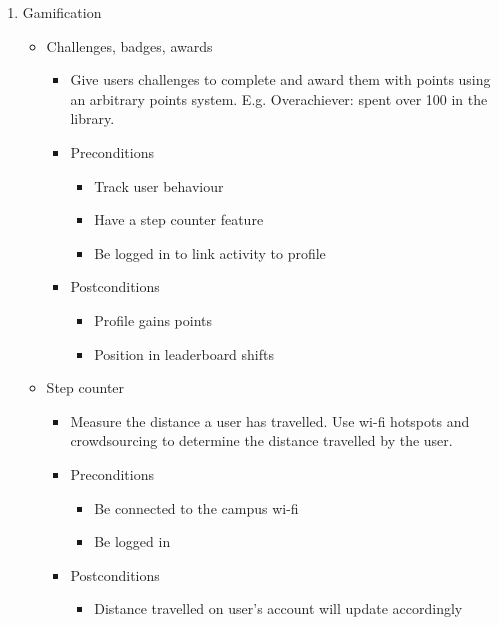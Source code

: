 \documentclass[12pt]{article}
\begin{document}
\begin{enumerate}
			\item Gamification 
			\begin{itemize}
				\item Challenges, badges, awards
				\begin{itemize}
					\item Give users challenges to complete and award them with points using an arbitrary points system. E.g. Overachiever: spent over 100 in the library. 
					\item Preconditions
					\begin{itemize}
						\item Track user behaviour
						\item Have a step counter feature
						\item Be logged in to link activity to profile
					\end{itemize}
					\item Postconditions
					\begin{itemize}
						\item Profile gains points
						\item Position in leaderboard shifts
					\end{itemize}
				\end{itemize}
				
				\item Step counter
				\begin{itemize}
					\item Measure the distance a user has travelled. Use wi-fi hotspots and crowdsourcing to determine the distance travelled by the user.
					\item Preconditions
					\begin{itemize}
						\item Be connected to the campus wi-fi
						\item Be logged in
					\end{itemize}
					\item Postconditions
					\begin{itemize}
						\item Distance travelled on user’s account will update accordingly
					\end{itemize}
				\end{itemize}
				

\end{itemize}
\end{enumerate}
\end{document}
